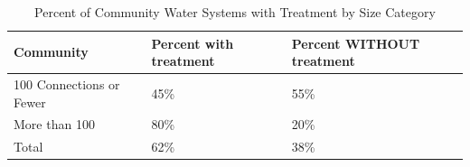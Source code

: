 



























\begin{table}[]
\begin{tabular}{|l|l|l|}
\hline
Community                    & Percent   with   treatment & Percent   WITHOUT   treatment \\ \hline
100 Connections   or   Fewer & 45\%                       & 55\%                          \\ \hline
More than   100              & 80\%                       & 20\%                          \\ \hline
Total                        & 62\%                       & 38\%                          \\ \hline
\end{tabular}
\caption{Percent of Community Water Systems with Treatment by Size Category}
\end{table}




